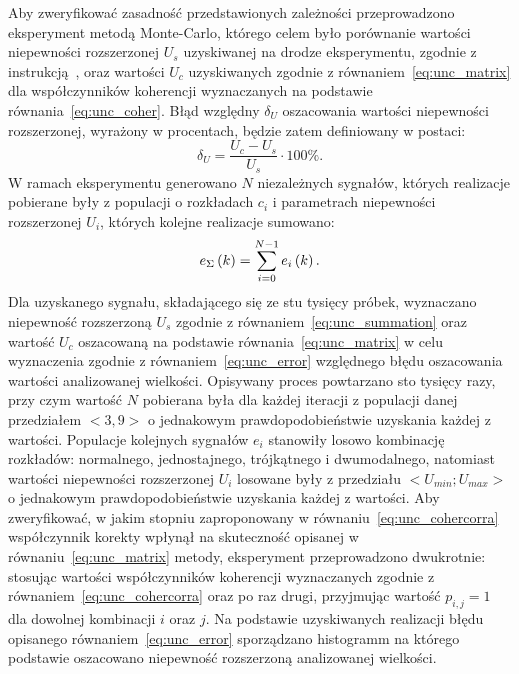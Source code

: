 Aby zweryfikować zasadność przedstawionych zależności przeprowadzono eksperyment metodą Monte-Carlo, którego celem było porównanie wartości niepewności rozszerzonej $U_{s}$ uzyskiwanej na drodze eksperymentu, zgodnie z instrukcją~\cite{jcgm_montecarlo}, oraz wartości $U_{c}$ uzyskiwanych zgodnie z równaniem~\eqref{eq:unc_matrix} dla współczynników koherencji wyznaczanych na podstawie równania~\eqref{eq:unc_coher}. Błąd względny $\delta_{U}$ oszacowania wartości niepewności rozszerzonej, wyrażony w procentach, będzie zatem definiowany w postaci:
\begin{equation}
\delta_{U} =  \frac{U_{c} - U_{s}}{U_{s}} \cdot 100\% \label{eq:unc_error}.
\end{equation}
W ramach eksperymentu generowano $N$ niezależnych sygnałów, których realizacje pobierane były z populacji o rozkładach $c_{i}$ i parametrach niepewności rozszerzonej $U_{i}$, których kolejne realizacje sumowano:
\begin{equation}
e_{\Sigma} \left(k\right) = \sum _{i=0} ^{N-1} e_{i} \left(k\right) \label{eq:unc_testsignal}.
\end{equation}
Dla uzyskanego sygnału, składającego się ze stu tysięcy próbek, wyznaczano niepewność rozszerzoną $U_{s}$ zgodnie z równaniem~\eqref{eq:unc_summation} oraz wartość $U_{c}$ oszacowaną na podstawie równania~\eqref{eq:unc_matrix} w celu wyznaczenia zgodnie z równaniem~\eqref{eq:unc_error} względnego błędu oszacowania wartości analizowanej wielkości. Opisywany proces powtarzano sto tysięcy razy, przy czym wartość $N$ pobierana była dla każdej iteracji z populacji danej przedziałem $<3,9>$ o jednakowym prawdopodobieństwie uzyskania każdej z wartości. Populacje kolejnych sygnałów $e_{i}$ stanowiły losowo kombinację rozkładów: normalnego, jednostajnego, trójkątnego i dwumodalnego, natomiast wartości niepewności rozszerzonej $U_{i}$ losowane były z przedziału $<U_{min};U_{max}>$ o jednakowym prawdopodobieństwie uzyskania każdej z wartości. Aby zweryfikować, w jakim stopniu zaproponowany w równaniu~\eqref{eq:unc_cohercorra} współczynnik korekty wpłynął na skuteczność opisanej w równaniu~\eqref{eq:unc_matrix} metody, eksperyment przeprowadzono dwukrotnie: stosując wartości współczynników koherencji wyznaczanych zgodnie z równaniem~\eqref{eq:unc_cohercorra} oraz po raz drugi, przyjmując wartość $p_{i,j} = 1$ dla dowolnej kombinacji $i$ oraz $j$. Na podstawie uzyskiwanych realizacji błędu opisanego równaniem~\eqref{eq:unc_error} sporządzano histogramm na którego podstawie oszacowano niepewność rozszerzoną analizowanej wielkości.

